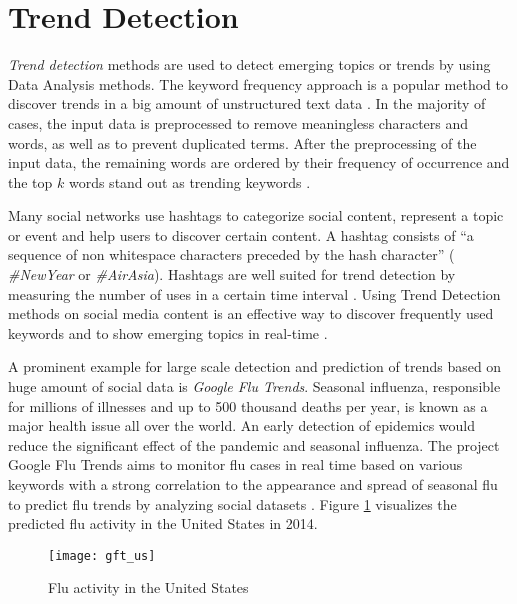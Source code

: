 \section{Trend Detection}
\label{sec:trends}
\textit{Trend detection} methods are used to detect emerging topics or trends by using Data Analysis methods. The keyword frequency approach is a popular method to discover trends in a big amount of unstructured text data \cite{journals/smarthome/Kim+13}. In the majority of cases, the input data is preprocessed to remove meaningless characters and words, as well as to prevent duplicated terms. After the preprocessing of the input data, the remaining words are ordered by their frequency of occurrence and the top $k$ words stand out as trending keywords \cite[213\psq]{journals/smarthome/Kim+13}.

Many social networks use hashtags to categorize social content, represent a topic or event and help users to discover certain content. A hashtag consists of \enquote{a sequence of non whitespace characters preceded by the hash character} \cites[644]{conf/wsdm/TsurR12}[1427]{conf/asunam/ZhangWL13} (\eg{} \textit{\#NewYear} or \textit{\#AirAsia}). Hashtags are well suited for trend detection by measuring the number of uses in a certain time interval \cite[1427]{conf/asunam/ZhangWL13}. Using Trend Detection methods on social media content is an effective way to discover frequently used keywords and to show emerging topics in real-time \cite{journals/smarthome/Kim+13,TwitterDataAnalytics2013}.

A prominent example for large scale detection and prediction of trends based on huge amount of social data is \textit{Google Flu Trends}. Seasonal influenza, responsible for millions of illnesses and up to 500 thousand deaths per year, is known as a major health issue all over the world. An early detection of epidemics would reduce the significant effect of the pandemic and seasonal influenza. The project Google Flu Trends aims to monitor flu cases in real time based on various keywords with a strong correlation to the appearance and spread of seasonal flu to predict flu trends by analyzing social datasets \cites{Google09detection}[1]{Weber2014,Tech22014}. Figure \ref{fig:use_case_gft} visualizes the predicted flu activity in the United States in 2014.

\begin{figure}[H]
  \centering
        \texttt{[image: gft\_us]}
  \caption[Flu activity in the United States]{Flu activity in the United States \cite{gft2014}}
  \label{fig:use_case_gft}
  \vspace{-1.3em}
\end{figure}